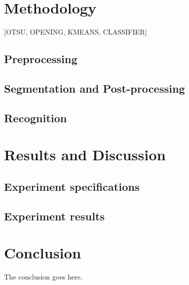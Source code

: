 \documentclass[conference,compsoc]{IEEEtran}
\begin{document}
\section{Methodology}
[OTSU, OPENING, KMEANS, CLASSIFIER]
\subsection{Preprocessing}
\subsection{Segmentation and Post-processing}
\subsection{Recognition}
\section{Results and Discussion}
\subsection{Experiment specifications}
\subsection{Experiment results}

\section{Conclusion}
The conclusion goes here.







\end{document}
